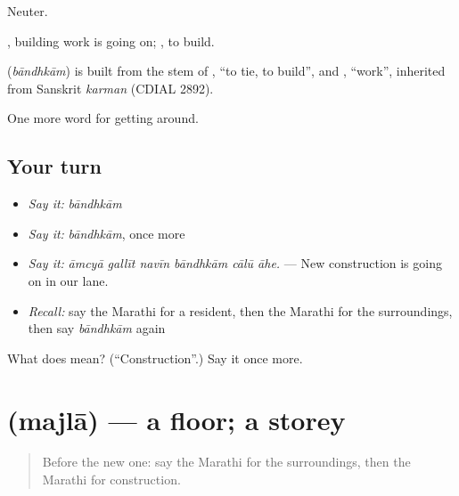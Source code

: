 Neuter.

  , building work is going on;  , to build.

\begin{cousinweb}
\textbf{} (\emph{bāndhkām}) is built from the stem of \textbf{}, \textquotedblleft{}to tie, to build\textquotedblright{}, and \textbf{}, \textquotedblleft{}work\textquotedblright{}, inherited from Sanskrit \emph{karman} (CDIAL 2892).
\end{cousinweb}

\begin{grammarlens}[title={What you've built}]
One more word for getting around.
\end{grammarlens}

\subsection*{Your turn}
\begin{itemize}
\raggedright
  \item \emph{Say it:} \emph{bāndhkām}
  \item \emph{Say it:} \emph{bāndhkām}, once more
  \item \emph{Say it:} \emph{āmcyā gallīt navīn bāndhkām cālū āhe.} — New construction is going on in our lane.
  \item \emph{Recall:} say the Marathi for a resident, then the Marathi for the surroundings, then say \emph{bāndhkām} again
\end{itemize}

\begin{tcolorbox}[breakable,colback=teal!4,colframe=teal!35!black,title={Before you move on}]
What does  mean? (\textquotedblleft{}Construction\textquotedblright{}.) Say it once more.
\end{tcolorbox}
\section[\texorpdfstring{\mr{मजला} (majlā)}{मजला (majlā)}]{ (majlā) — a floor; a storey}

\label{lesson:MR-C421-majla}



\begin{quote}
Before the new one: say the Marathi for the surroundings, then the Marathi for construction.
\end{quote}

